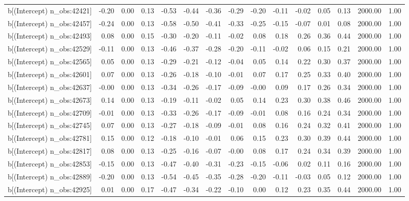 \begin{table}[ht]
\begin{tabular}{rrrrrrrrrrrrrrr}
  b[(Intercept) n\_obs:42421] & -0.20 & 0.00 & 0.13 & -0.53 & -0.44 & -0.36 & -0.29 & -0.20 & -0.11 & -0.02 & 0.05 & 0.13 & 2000.00 & 1.00 \\ 
  b[(Intercept) n\_obs:42457] & -0.24 & 0.00 & 0.13 & -0.58 & -0.50 & -0.41 & -0.33 & -0.25 & -0.15 & -0.07 & 0.01 & 0.08 & 2000.00 & 1.00 \\ 
  b[(Intercept) n\_obs:42493] & 0.08 & 0.00 & 0.15 & -0.30 & -0.20 & -0.11 & -0.02 & 0.08 & 0.18 & 0.26 & 0.36 & 0.44 & 2000.00 & 1.00 \\ 
  b[(Intercept) n\_obs:42529] & -0.11 & 0.00 & 0.13 & -0.46 & -0.37 & -0.28 & -0.20 & -0.11 & -0.02 & 0.06 & 0.15 & 0.21 & 2000.00 & 1.00 \\ 
  b[(Intercept) n\_obs:42565] & 0.05 & 0.00 & 0.13 & -0.29 & -0.21 & -0.12 & -0.04 & 0.05 & 0.14 & 0.22 & 0.30 & 0.37 & 2000.00 & 1.00 \\ 
  b[(Intercept) n\_obs:42601] & 0.07 & 0.00 & 0.13 & -0.26 & -0.18 & -0.10 & -0.01 & 0.07 & 0.17 & 0.25 & 0.33 & 0.40 & 2000.00 & 1.00 \\ 
  b[(Intercept) n\_obs:42637] & -0.00 & 0.00 & 0.13 & -0.34 & -0.26 & -0.17 & -0.09 & -0.00 & 0.09 & 0.17 & 0.26 & 0.34 & 2000.00 & 1.00 \\ 
  b[(Intercept) n\_obs:42673] & 0.14 & 0.00 & 0.13 & -0.19 & -0.11 & -0.02 & 0.05 & 0.14 & 0.23 & 0.30 & 0.38 & 0.46 & 2000.00 & 1.00 \\ 
  b[(Intercept) n\_obs:42709] & -0.01 & 0.00 & 0.13 & -0.33 & -0.26 & -0.17 & -0.09 & -0.01 & 0.08 & 0.16 & 0.24 & 0.34 & 2000.00 & 1.00 \\ 
  b[(Intercept) n\_obs:42745] & 0.07 & 0.00 & 0.13 & -0.27 & -0.18 & -0.09 & -0.01 & 0.08 & 0.16 & 0.24 & 0.32 & 0.41 & 2000.00 & 1.00 \\ 
  b[(Intercept) n\_obs:42781] & 0.15 & 0.00 & 0.12 & -0.18 & -0.10 & -0.01 & 0.06 & 0.15 & 0.23 & 0.30 & 0.39 & 0.44 & 2000.00 & 1.00 \\ 
  b[(Intercept) n\_obs:42817] & 0.08 & 0.00 & 0.13 & -0.25 & -0.16 & -0.07 & -0.00 & 0.08 & 0.17 & 0.24 & 0.34 & 0.39 & 2000.00 & 1.00 \\ 
  b[(Intercept) n\_obs:42853] & -0.15 & 0.00 & 0.13 & -0.47 & -0.40 & -0.31 & -0.23 & -0.15 & -0.06 & 0.02 & 0.11 & 0.16 & 2000.00 & 1.00 \\ 
  b[(Intercept) n\_obs:42889] & -0.20 & 0.00 & 0.13 & -0.54 & -0.45 & -0.35 & -0.28 & -0.20 & -0.11 & -0.03 & 0.05 & 0.12 & 2000.00 & 1.00 \\ 
  b[(Intercept) n\_obs:42925] & 0.01 & 0.00 & 0.17 & -0.47 & -0.34 & -0.22 & -0.10 & 0.00 & 0.12 & 0.23 & 0.35 & 0.44 & 2000.00 & 1.00 \\ 

\end{tabular}
\end{table}

